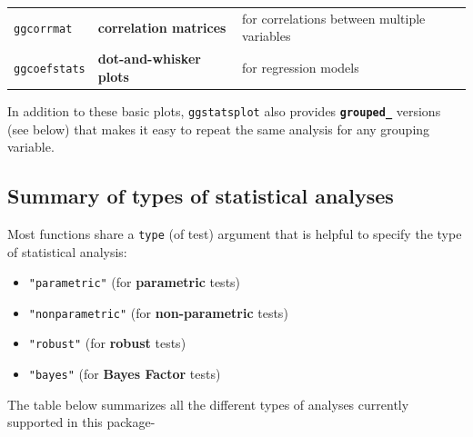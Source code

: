 \documentclass[]{article}
\providecommand{\tightlist}{%
  \setlength{\itemsep}{0pt}\setlength{\parskip}{0pt}}
\begin{document}
\begin{longtable}[]{@{}lll@{}}
\begin{minipage}[t]{0.17\columnwidth}\raggedright
\texttt{ggcorrmat}\strut
\end{minipage} & \begin{minipage}[t]{0.25\columnwidth}\raggedright
\textbf{correlation matrices}\strut
\end{minipage} & \begin{minipage}[t]{0.49\columnwidth}\raggedright
for correlations between multiple variables\strut
\end{minipage}\tabularnewline
\begin{minipage}[t]{0.17\columnwidth}\raggedright
\texttt{ggcoefstats}\strut
\end{minipage} & \begin{minipage}[t]{0.25\columnwidth}\raggedright
\textbf{dot-and-whisker plots}\strut
\end{minipage} & \begin{minipage}[t]{0.49\columnwidth}\raggedright
for regression models\strut
\end{minipage}\tabularnewline
\bottomrule
\end{longtable}

In addition to these basic plots, \texttt{ggstatsplot} also provides \textbf{\texttt{grouped\_}}
versions (see below) that makes it easy to repeat the same analysis for
any grouping variable.

\hypertarget{summary-of-types-of-statistical-analyses}{%
\subsection{Summary of types of statistical analyses}\label{summary-of-types-of-statistical-analyses}}

Most functions share a \texttt{type} (of test) argument that is helpful to specify the
type of statistical analysis:

\begin{itemize}
\tightlist
\item
  \texttt{"parametric"} (for \textbf{parametric} tests)
\item
  \texttt{"nonparametric"} (for \textbf{non-parametric} tests)
\item
  \texttt{"robust"} (for \textbf{robust} tests)
\item
  \texttt{"bayes"} (for \textbf{Bayes Factor} tests)
\end{itemize}

The table below summarizes all the different types of analyses
currently supported in this package-
\end{document}
